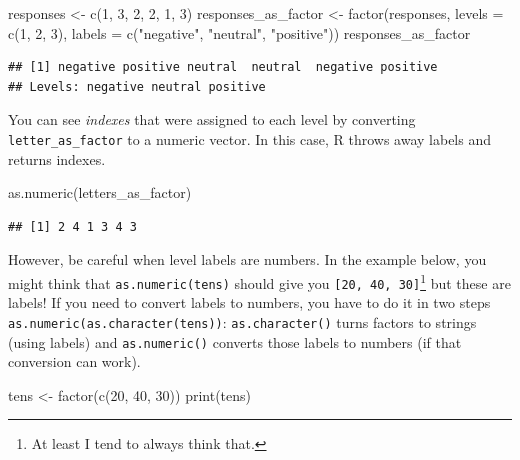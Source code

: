 \documentclass[
]{book}
\newenvironment{Shaded}{\begin{snugshade}}{\end{snugshade}}
\newcommand{\AttributeTok}[1]{\textcolor[rgb]{0.77,0.63,0.00}{#1}}
\newcommand{\DecValTok}[1]{\textcolor[rgb]{0.00,0.00,0.81}{#1}}
\newcommand{\FunctionTok}[1]{\textcolor[rgb]{0.00,0.00,0.00}{#1}}
\newcommand{\NormalTok}[1]{#1}
\newcommand{\OtherTok}[1]{\textcolor[rgb]{0.56,0.35,0.01}{#1}}
\newcommand{\StringTok}[1]{\textcolor[rgb]{0.31,0.60,0.02}{#1}}
\begin{document}
\begin{Shaded}
\begin{Highlighting}[]
\NormalTok{responses }\OtherTok{\textless{}{-}} \FunctionTok{c}\NormalTok{(}\DecValTok{1}\NormalTok{, }\DecValTok{3}\NormalTok{, }\DecValTok{2}\NormalTok{, }\DecValTok{2}\NormalTok{, }\DecValTok{1}\NormalTok{, }\DecValTok{3}\NormalTok{)}
\NormalTok{responses\_as\_factor }\OtherTok{\textless{}{-}} \FunctionTok{factor}\NormalTok{(responses, }\AttributeTok{levels =} \FunctionTok{c}\NormalTok{(}\DecValTok{1}\NormalTok{, }\DecValTok{2}\NormalTok{, }\DecValTok{3}\NormalTok{), }\AttributeTok{labels =} \FunctionTok{c}\NormalTok{(}\StringTok{"negative"}\NormalTok{, }\StringTok{"neutral"}\NormalTok{, }\StringTok{"positive"}\NormalTok{))}
\NormalTok{responses\_as\_factor}
\end{Highlighting}
\end{Shaded}

\begin{verbatim}
## [1] negative positive neutral  neutral  negative positive
## Levels: negative neutral positive
\end{verbatim}

You can see \emph{indexes} that were assigned to each level by converting \texttt{letter\_as\_factor} to a numeric vector. In this case, R throws away labels and returns indexes.

\begin{Shaded}
\begin{Highlighting}[]
\FunctionTok{as.numeric}\NormalTok{(letters\_as\_factor)}
\end{Highlighting}
\end{Shaded}

\begin{verbatim}
## [1] 2 4 1 3 4 3
\end{verbatim}

However, be careful when level labels are numbers. In the example below, you might think that \texttt{as.numeric(tens)} should give you \texttt{{[}20,\ 40,\ 30{]}}\footnote{At least I tend to always think that.} but these are labels! If you need to convert labels to numbers, you have to do it in two steps \texttt{as.numeric(as.character(tens))}: \texttt{as.character()} turns factors to strings (using labels) and \texttt{as.numeric()} converts those labels to numbers (if that conversion can work).

\begin{Shaded}
\begin{Highlighting}[]
\NormalTok{tens }\OtherTok{\textless{}{-}} \FunctionTok{factor}\NormalTok{(}\FunctionTok{c}\NormalTok{(}\DecValTok{20}\NormalTok{, }\DecValTok{40}\NormalTok{, }\DecValTok{30}\NormalTok{))}
\FunctionTok{print}\NormalTok{(tens)}
\end{Highlighting}
\end{Shaded}
\end{document}
